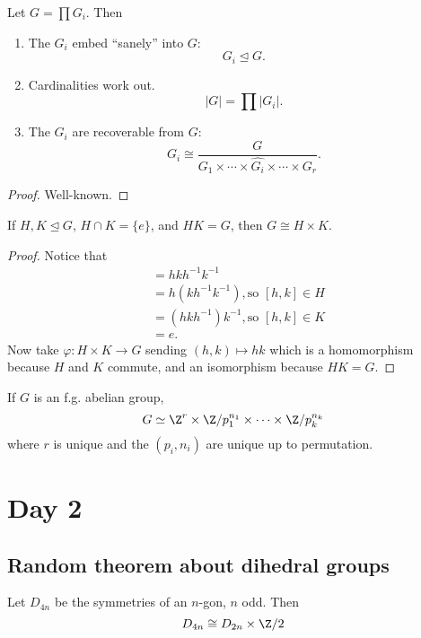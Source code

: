 \documentclass{article}
\begin{document}
\begin{thm}
  Let $G=\prod G_i$. Then
  \begin{enumerate}
  \item The $G_i$  embed ``sanely'' into $G$:
    $$G_i\trianglelefteq G.$$
  \item Cardinalities work out.
    $$|G| = \prod |G_i|.$$
  \item The $G_i$ are recoverable from $G$:
    $$G_i \cong \frac{G}{G_1\times\cdots\times \hat{G_i}\times\cdots\times G_r}.$$
  \end{enumerate}
\end{thm}
\begin{proof}
 Well-known. 
\end{proof}

\begin{thm}
  If $H,K\trianglelefteq G$, $H\cap K = \{e\}$, and $HK = G$, then $G\cong
  H\times K$. 
\end{thm}
\begin{proof}
  Notice that
  \begin{align*}
    [h,k] &= hkh^{-1}k^{-1} \\
          &= h(kh^{-1}k^{-1}), \text{so } [h,k]\in H \\
          &= (hkh^{-1})k^{-1}, \text{so } [h,k]\in K \\
          &= e.
  \end{align*} 
  Now take $\varphi:H\times K\to G$ sending $(h,k)\mapsto hk$ which is a
  homomorphism because $H$ and $K$ commute, and an isomorphism because $HK = G$.
\end{proof}

\begin{thm}
  If $G$ is an f.g. abelian group,
  $$G\simeq \Z^r \times \Z/p_1^{n_1} \times\cdots\times \Z/p_k^{n_k}$$
  where $r$ is unique and the $(p_i,n_i)$ are unique up to permutation.
\end{thm}

\section{Day 2}
\subsection{Random theorem about dihedral groups}

\begin{thm}
  Let $D_{4n}$ be the symmetries of an $n$-gon, $n$ odd. Then
$$D_{4n} \cong D_{2n} \times \Z/2$$
\end{thm}
\end{document}
